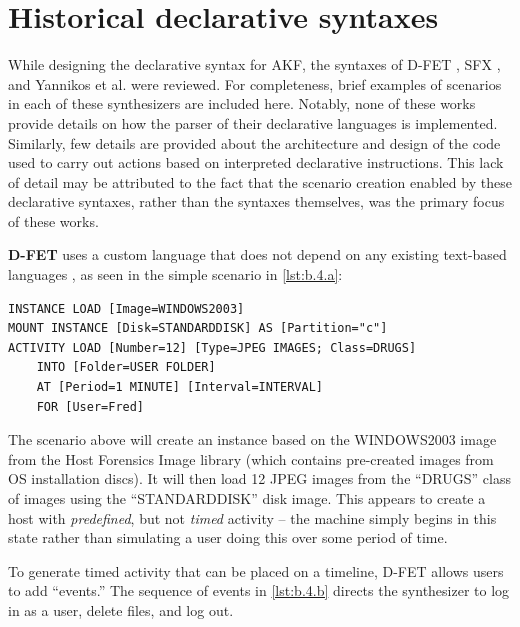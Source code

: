 \documentclass[letterpaper,12pt]{report}
\begin{document}
\section{Historical declarative
syntaxes}\label{historical-declarative-syntaxes}

While designing the declarative syntax for AKF, the syntaxes of D-FET
\cite{williamCloudbasedDigitalForensics2011}, SFX
\cite{russellForensicImageDescription2012}, and Yannikos et al.
\cite{yannikosDataCorporaDigital2014} were reviewed. For
completeness, brief examples of scenarios in each of these synthesizers
are included here. Notably, none of these works provide details on how
the parser of their declarative languages is implemented. Similarly, few
details are provided about the architecture and design of the code used
to carry out actions based on interpreted declarative instructions. This
lack of detail may be attributed to the fact that the scenario creation
enabled by these declarative syntaxes, rather than the syntaxes
themselves, was the primary focus of these works.

\textbf{D-FET} uses a custom language that does not depend on any
existing text-based languages
\cite{williamCloudbasedDigitalForensics2011}, as seen in the simple
scenario in \autoref{lst:b.4.a}:

\begin{lstlisting}[label={lst:b.4.a}, caption={Sample D-FET declarative scenario without events \cite{williamCloudbasedDigitalForensics2011}}, ]
INSTANCE LOAD [Image=WINDOWS2003] 
MOUNT INSTANCE [Disk=STANDARDDISK] AS [Partition="c"] 
ACTIVITY LOAD [Number=12] [Type=JPEG IMAGES; Class=DRUGS] 
    INTO [Folder=USER FOLDER] 
    AT [Period=1 MINUTE] [Interval=INTERVAL] 
    FOR [User=Fred]
\end{lstlisting}

The scenario above will create an instance based on the WINDOWS2003
image from the Host Forensics Image library (which contains pre-created
images from OS installation discs). It will then load 12 JPEG images
from the ``DRUGS'' class of images using the ``STANDARDDISK'' disk
image. This appears to create a host with \emph{predefined}, but not
\emph{timed} activity -- the machine simply begins in this state rather
than simulating a user doing this over some period of time.

To generate timed activity that can be placed on a timeline, D-FET
allows users to add ``events.'' The sequence of events in
\autoref{lst:b.4.b} directs the synthesizer to log in as a user, delete
files, and log out.
\end{document}
